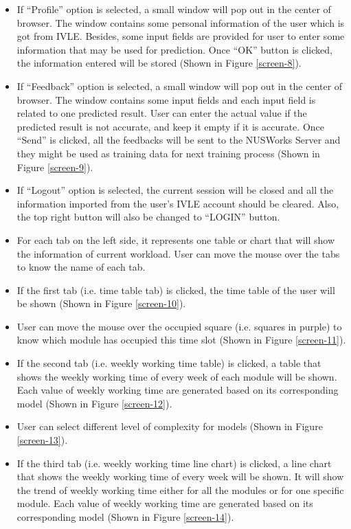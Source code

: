 \documentclass[fyp]{socreport}
\begin{document}
\begin{itemize}
	\item If “Profile” option is selected, a small window will pop out in the center of browser. The window contains some personal information of the user which is got from IVLE. Besides, some input fields are provided for user to enter some information that may be used for prediction. Once “OK” button is clicked, the information entered will be stored (Shown in Figure {\ref{screen-8}}).
	\item If “Feedback” option is selected, a small window will pop out in the center of browser. The window contains some input fields and each input field is related to one predicted result. User can enter the actual value if the predicted result is not accurate, and keep it empty if it is accurate. Once “Send” is clicked, all the feedbacks will be sent to the NUSWorks Server and they might be used as training data for next training process (Shown in Figure {\ref{screen-9}}).
	\item If “Logout” option is selected, the current session will be closed and all the information imported from the user’s IVLE account should be cleared. Also, the top right button will also be changed to “LOGIN” button.
	\item For each tab on the left side, it represents one table or chart that will show the information of current workload. User can move the mouse over the tabs to know the name of each tab.
	\item If the first tab (i.e. time table tab) is clicked, the time table of the user will be shown (Shown in Figure {\ref{screen-10}}).
	\item User can move the mouse over the occupied square (i.e. squares in purple) to know which module has occupied this time slot (Shown in Figure {\ref{screen-11}}).
	\item If the second tab (i.e. weekly working time table) is clicked, a table that shows the weekly working time of every week of each module will be shown. Each value of weekly working time are generated based on its corresponding model (Shown in Figure {\ref{screen-12}}).
	\item User can select different level of complexity for models (Shown in Figure {\ref{screen-13}}).
	\item If the third tab (i.e. weekly working time line chart) is clicked, a line chart that shows the weekly working time of every week will be shown. It will show the trend of weekly working time either for all the modules or for one specific module. Each value of weekly working time are generated based on its corresponding model (Shown in Figure {\ref{screen-14}}).

\end{itemize}
\end{document}
